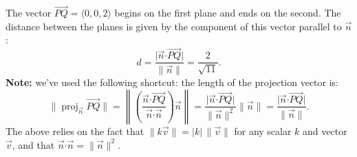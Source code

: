 \documentclass[12pt]{article}
\newcommand{\abs}[1]{\lvert #1\rvert}
\newcommand{\len}[1]{\lVert #1\rVert}
\newcommand{\dotp}{\boldsymbol{\cdot}}
\DeclareMathOperator{\proj}{proj}
\begin{document}
\begin{enumerate}
The vector $\overrightarrow{PQ}=\langle 0,0,2\rangle$ begins on the first plane and ends on the second. The distance between the planes is given by the component of this vector parallel to $\vec{n}$:
\[
d = \frac{\abs{\vec{n}\dotp\overrightarrow{PQ}}}{\len{\vec{n}}} = \frac{2}{\sqrt{11}}.
\]
\textbf{Note:} we've used the following shortcut: the length of the projection vector is:
\[
\len{\proj_{\vec{n}}\overrightarrow{PQ}} = \left\lVert\left( \frac{\vec{n}\dotp\overrightarrow{PQ}}{\vec{n}\dotp\vec{n}}\right)\vec{n}\right\rVert= \frac{\abs{\vec{n}\dotp\overrightarrow{PQ}}}{\len{\vec{n}}^2}\len{\vec{n}} = \frac{\abs{\vec{n}\dotp\overrightarrow{PQ}}}{\len{\vec{n}}}.
\]
The above relies on the fact that $\len{k\vec{v}}=\abs{k}\,\len{\vec{v}}$ for any scalar $k$ and vector $\vec{v}$, and that $\vec{n}\dotp\vec{n}=\len{\vec{n}}^2$.
\end{enumerate}
\end{document}
